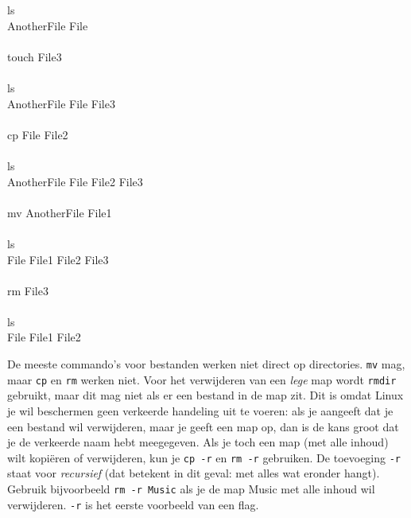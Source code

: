 \begin{bash}
\userprompt ls\\
AnotherFile  File\\
\\
\userprompt touch File3\\
\\
\userprompt ls\\
AnotherFile  File  File3\\
\\
\userprompt cp File File2\\
\\
\userprompt ls\\
AnotherFile  File  File2  File3\\
\\
\userprompt mv AnotherFile File1\\
\\
\userprompt ls\\
File  File1  File2  File3\\
\\
\userprompt rm File3\\
\\
\userprompt ls\\
File  File1  File2\\
\end{bash}

De meeste commando's voor bestanden werken niet direct op directories. \texttt{mv} mag, maar \texttt{cp} en \texttt{rm} werken niet. Voor het verwijderen van een \emph{lege} map wordt \texttt{rmdir} gebruikt, maar dit mag niet als er een bestand in de map zit. Dit is omdat Linux je wil beschermen geen verkeerde handeling uit te voeren: als je aangeeft dat je een bestand wil verwijderen, maar je geeft een map op, dan is de kans groot dat je de verkeerde naam hebt meegegeven. Als je toch een map (met alle inhoud) wilt kopiëren of verwijderen, kun je \texttt{cp\ -r} en \texttt{rm\ -r} gebruiken. De toevoeging \texttt{-r} staat voor \emph{recursief} (dat betekent in dit geval: met alles wat eronder hangt). Gebruik bijvoorbeeld \texttt{rm\ -r\ Music} als je de map Music met alle inhoud wil verwijderen. \texttt{-r} is het eerste voorbeeld van een flag.

